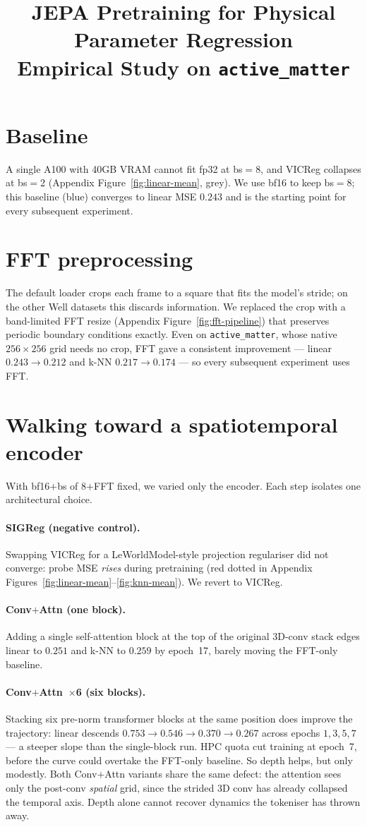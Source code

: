 \documentclass[11pt]{article}
\title{JEPA Pretraining for Physical Parameter Regression\\
       \large Empirical Study on \texttt{active\_matter}}
\begin{document}
\section{Baseline}

A single A100 with 40GB VRAM cannot fit fp32 at bs$=$8, and VICReg
collapses at bs$=$2 (Appendix Figure~\ref{fig:linear-mean}, grey). We
use bf16 to keep bs$=$8; this baseline (blue) converges to linear MSE
$0.243$ and is the starting point for every subsequent experiment.

\section{FFT preprocessing}

The default loader crops each frame to a square that fits the model's
stride; on the other Well datasets this discards information. We replaced
the crop with a band-limited FFT resize (Appendix
Figure~\ref{fig:fft-pipeline}) that preserves periodic boundary conditions
exactly. Even on \texttt{active\_matter}, whose native $256{\times}256$
grid needs no crop, FFT gave a consistent improvement — linear
$0.243 \to 0.212$ and k-NN $0.217 \to 0.174$ — so every subsequent
experiment uses FFT.

\section{Walking toward a spatiotemporal encoder}

With bf16$+$bs of 8$+$FFT fixed, we varied only the encoder. Each step
isolates one architectural choice.

\paragraph{SIGReg (negative control).}
Swapping VICReg for a LeWorldModel-style projection regulariser did not
converge: probe MSE \emph{rises} during pretraining (red dotted in
Appendix Figures~\ref{fig:linear-mean}--\ref{fig:knn-mean}). We revert to
VICReg.

\paragraph{Conv$+$Attn (one block).}
Adding a single self-attention block at the top of the original 3D-conv stack
edges linear to $0.251$ and k-NN to $0.259$ by epoch~17, barely moving
the FFT-only baseline.

\paragraph{Conv$+$Attn~$\times$6 (six blocks).}
Stacking six pre-norm transformer blocks at the same position does
improve the trajectory: linear descends
$0.753 \to 0.546 \to 0.370 \to 0.267$ across epochs $1, 3, 5, 7$ —
a steeper slope than the single-block run. HPC quota cut training at
epoch~7, before the curve could overtake the FFT-only baseline. So
depth helps, but only modestly. Both Conv$+$Attn variants share the
same defect: the attention sees only the post-conv \emph{spatial}
grid, since the strided 3D conv has already collapsed the temporal
axis. Depth alone cannot recover dynamics the tokeniser has thrown
away.
\end{document}
